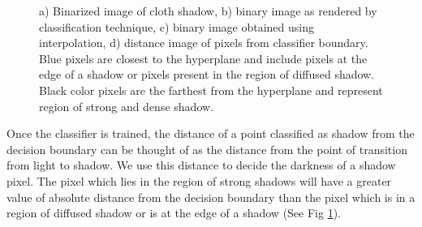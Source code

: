 \begin{figure}[h]
{\label{fig:subfig2} }    \caption{a) Binarized image of cloth shadow, b) binary
image as rendered by classification technique, c) binary image obtained using
interpolation, d) distance image of pixels from classifier boundary. Blue pixels
are closest to the hyperplane and include pixels at the edge of a shadow or
pixels present in the region of diffused shadow. Black color pixels are the
farthest from the hyperplane and represent region of strong and dense shadow.}
\label{fig:classify}
\end{figure}
Once the classifier is trained, the distance of a point classified as shadow
from the decision boundary can be thought of as the distance from the point of
transition from light to shadow. We use this distance to decide the darkness of
a shadow pixel. The pixel which lies in the region of strong shadows will have a
greater value of absolute distance from the decision boundary than the pixel
which is in a region of diffused shadow or is at the edge of a shadow (See
Fig \ref{fig:classify}).



